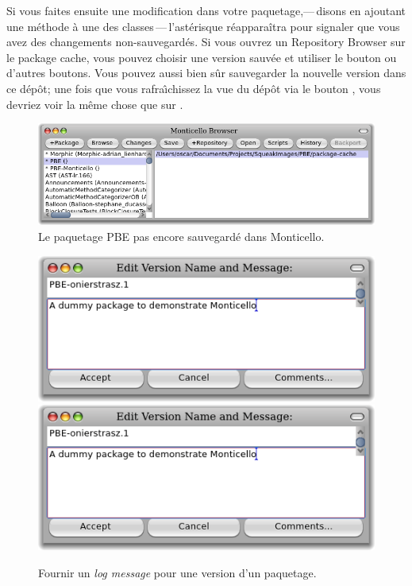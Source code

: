 \documentclass[a4paper,10pt,twoside]{book}
\begin{document}
Si vous faites ensuite une modification dans votre paquetage,---\,disons
en ajoutant une m\'ethode \`a une des classes\,---\,l'ast\'erisque r\'eappara\^itra pour signaler que vous avez des changements non-sauvegard\'es.
Si vous ouvrez un Repository Browser sur le package cache, vous
pouvez choisir une version sauv\'ee et utiliser le bouton 
ou d'autres boutons.
Vous pouvez aussi bien s\^ur sauvegarder la nouvelle version dans
ce d\'ep\^ot; une fois que vous rafra\^{\i}chissez la vue
du d\'ep\^ot via le bouton , vous devriez voir
la m\^eme chose que sur
.

\begin{figure}[tbp]
	\begin{center}
		\includegraphics[width=\textwidth]{MC+PBE}
	\end{center}
	\caption{Le paquetage PBE pas encore sauvegard\'e dans Monticello.}
	\label{fig:MC+PBE}
\end{figure}

\begin{figure}[tbp]
	\begin{center}
	\ifluluelse
		{\includegraphics[width=\textwidth]{PBE-on}}
		{\includegraphics[scale=0.7]{PBE-on}}
	\end{center}
	\caption{Fournir un \emph{log message} pour une version d'un paquetage.}
	\label{fig:PBE-on}
\end{figure}
\end{document}
